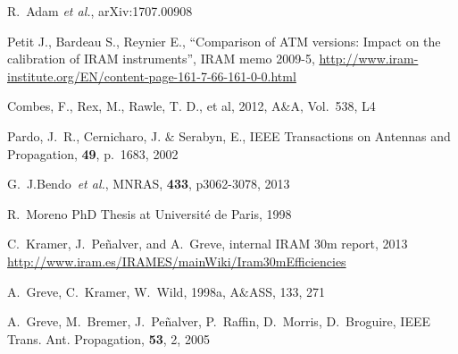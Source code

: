 
\begin{thebibliography}{99}
  
 R.~Adam {\it et al.}, arXiv:1707.00908
  
Petit J., Bardeau S., Reynier E., ``Comparison of ATM versions: Impact
on the calibration of IRAM instruments'', IRAM memo 2009-5,
\url{http://www.iram-institute.org/EN/content-page-161-7-66-161-0-0.html}

 Combes, F., Rex, M., Rawle, T. D., et al, 2012, A\&A,
  Vol.~538, L4

  Pardo, J.~R., Cernicharo, J. $\&$ Serabyn, E., IEEE Transactions on
  Antennas and Propagation, {\bf 49}, p.~1683, 2002
  


  
  G.~J.Bendo~{\it et al.}, MNRAS, {\bf 433}, p{3062-3078}, 2013 

R.~Moreno PhD Thesis at
Universit\'e de Paris, 1998
  
  C.~Kramer, J.~Pe\~nalver, and A.~Greve, internal IRAM 30m report,
  2013
  \url{http://www.iram.es/IRAMES/mainWiki/Iram30mEfficiencies}

A.~Greve, C.~Kramer, W.~Wild, 1998a, A$\&$ASS, 133, 271

A.~Greve, M.~Bremer, J.~Pe\~nalver, P.~Raffin, D.~Morris, D.~Broguire,
IEEE Trans. Ant. Propagation, {\bf 53}, 2, 2005
  

\end{thebibliography}
